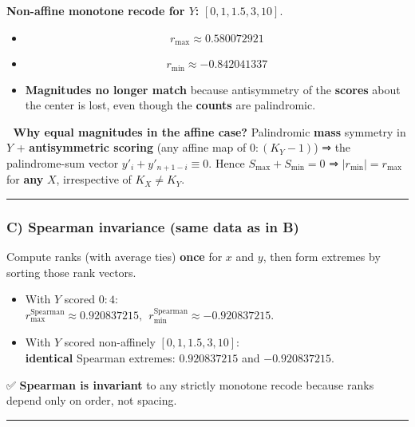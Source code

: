 \documentclass[
  letterpaper,
  DIV=11,
  numbers=noendperiod]{scrartcl}
\theoremstyle{remark}
\begin{document}
\textbf{Non-affine monotone recode for \(Y\):} \([0,1,1.5,3,10]\).

\begin{itemize}
\item
  \[r_{\max}\approx 0.580072921\]
\item
  \[r_{\min}\approx -0.842041337\]
\item
  \textbf{Magnitudes no longer match} because antisymmetry of the
  \textbf{scores} about the center is lost, even though the
  \textbf{counts} are palindromic.
\end{itemize}

🧠 \textbf{Why equal magnitudes in the affine case?} Palindromic
\textbf{mass} symmetry in \(Y\) + \textbf{antisymmetric scoring} (any
affine map of \(0{:}(K_Y-1)\)) ⇒ the palindrome-sum vector
\(y'_i+y'_{n+1-i}\equiv 0\). Hence \(S_{\max}+S_{\min}=0\) ⇒
\(|r_{\min}|=r_{\max}\) for \textbf{any} \(X\), irrespective of
\(K_X\neq K_Y\).

\begin{center}\rule{0.5\linewidth}{0.5pt}\end{center}

\subsubsection{\texorpdfstring{C) \textbf{Spearman invariance (same data
as in
B)}}{C) Spearman invariance (same data as in B)}}\label{c-spearman-invariance-same-data-as-in-b}

Compute ranks (with average ties) \textbf{once} for \(x\) and \(y\),
then form extremes by sorting those rank vectors.

\begin{itemize}
\item
  With \(Y\) scored \(0{:}4\):\\
  \(r_{\max}^{\text{Spearman}}\approx 0.920837215,\ \ r_{\min}^{\text{Spearman}}\approx -0.920837215\).
\item
  With \(Y\) scored non-affinely \([0,1,1.5,3,10]\):\\
  \textbf{identical} Spearman extremes: \(0.920837215\) and
  \(-0.920837215\).
\end{itemize}

✅ \textbf{Spearman is invariant} to any strictly monotone recode
because ranks depend only on order, not spacing.

\begin{center}\rule{0.5\linewidth}{0.5pt}\end{center}
\end{document}
